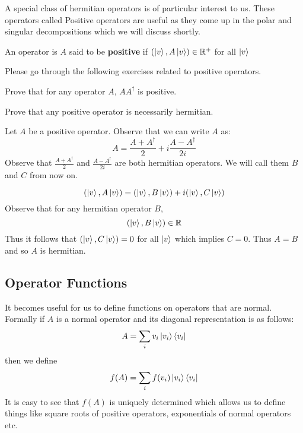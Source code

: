 A special class of hermitian operators is of particular interest to us. These operators called Positive operators are useful as they come up in the polar and singular decompositions which we will discuss shortly.
\begin{definition}
An operator is $A$ said to be \textbf{positive} if $(\ket{v}, A\ket{v}) \in \mathbb{R}^{+}$ for all $\ket{v}$
\end{definition}

Please go through the following exercises related  to positive operators.
\begin{exercise}
Prove that for any operator $A$, $AA^\dagger$ is positive.
\end{exercise}
\begin{exercise}
Prove that any positive operator is necessarily hermitian.
\end{exercise}
\begin{solution}
Let  $A$ be a positive operator. Observe that we can write  $A$ as:
$$ A = \frac{A+A^\dagger}{2} + i\frac{A-A^\dagger}{2i}$$
Observe that $\frac{A+A^\dagger}{2}$ and $\frac{A-A^\dagger}{2i}$ are both hermitian operators. We will call them $B$ and $C$ from now on.

$$(\ket{v}, A\ket{v}) = (\ket{v}, B\ket{v}) + i(\ket{v}, C\ket{v})$$
Observe that for any hermitian operator $B$, 
$$ (\ket{v}, B\ket{v}) \in \mathbb{R}$$
Thus it follows that $ (\ket{v}, C\ket{v}) = 0$ for all $\ket{v}$ which implies $C = 0$. Thus $A = B$ and so $A$ is hermitian.
\end{solution}

\subsection{Operator Functions}
It becomes useful for us to define functions on operators that are normal. Formally if $A$ is a normal operator and its diagonal representation is as follows:
$$ A = \sum_i v_i \ket{v_i}\bra{v_i}$$ 
then we define $$f(A) = \sum_i f(v_i) \ket{v_i}\bra{v_i}$$
It is easy to see that $f(A)$ is uniquely determined which allows us to define things like square roots of positive operators, exponentials of normal operators etc.

